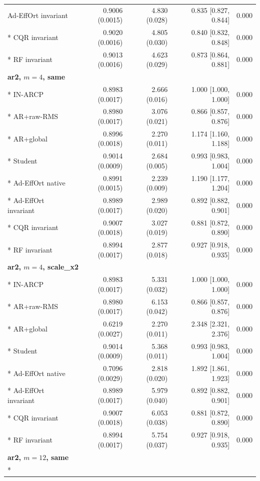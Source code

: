 \begin{longtable}{lrrrr}
Ad-EffOrt invariant & 0.9006 (0.0015) & 4.830 (0.028) & 0.835 [0.827, 0.844] & 0.000 \\*
CQR invariant & 0.9020 (0.0016) & 4.805 (0.030) & 0.840 [0.832, 0.848] & 0.000 \\*
RF invariant & 0.9013 (0.0016) & 4.623 (0.029) & 0.873 [0.864, 0.881] & 0.000 \\
\midrule
\multicolumn{5}{l}{\textbf{ar2, $m=4$, same}}\\*
IN-ARCP & 0.8983 (0.0017) & 2.666 (0.016) & 1.000 [1.000, 1.000] & 0.000 \\*
AR+raw-RMS & 0.8980 (0.0017) & 3.076 (0.021) & 0.866 [0.857, 0.876] & 0.000 \\*
AR+global & 0.8996 (0.0018) & 2.270 (0.011) & 1.174 [1.160, 1.188] & 0.000 \\*
Student & 0.9014 (0.0009) & 2.684 (0.005) & 0.993 [0.983, 1.004] & 0.000 \\*
Ad-EffOrt native & 0.8991 (0.0015) & 2.239 (0.009) & 1.190 [1.177, 1.204] & 0.000 \\*
Ad-EffOrt invariant & 0.8989 (0.0017) & 2.989 (0.020) & 0.892 [0.882, 0.901] & 0.000 \\*
CQR invariant & 0.9007 (0.0018) & 3.027 (0.019) & 0.881 [0.872, 0.890] & 0.000 \\*
RF invariant & 0.8994 (0.0017) & 2.877 (0.018) & 0.927 [0.918, 0.935] & 0.000 \\
\midrule
\multicolumn{5}{l}{\textbf{ar2, $m=4$, scale\_x2}}\\*
IN-ARCP & 0.8983 (0.0017) & 5.331 (0.032) & 1.000 [1.000, 1.000] & 0.000 \\*
AR+raw-RMS & 0.8980 (0.0017) & 6.153 (0.042) & 0.866 [0.857, 0.876] & 0.000 \\*
AR+global & 0.6219 (0.0027) & 2.270 (0.011) & 2.348 [2.321, 2.376] & 0.000 \\*
Student & 0.9014 (0.0009) & 5.368 (0.011) & 0.993 [0.983, 1.004] & 0.000 \\*
Ad-EffOrt native & 0.7096 (0.0029) & 2.818 (0.020) & 1.892 [1.861, 1.923] & 0.000 \\*
Ad-EffOrt invariant & 0.8989 (0.0017) & 5.979 (0.040) & 0.892 [0.882, 0.901] & 0.000 \\*
CQR invariant & 0.9007 (0.0018) & 6.053 (0.038) & 0.881 [0.872, 0.890] & 0.000 \\*
RF invariant & 0.8994 (0.0017) & 5.754 (0.037) & 0.927 [0.918, 0.935] & 0.000 \\
\midrule
\multicolumn{5}{l}{\textbf{ar2, $m=12$, same}}\\*

\end{longtable}
